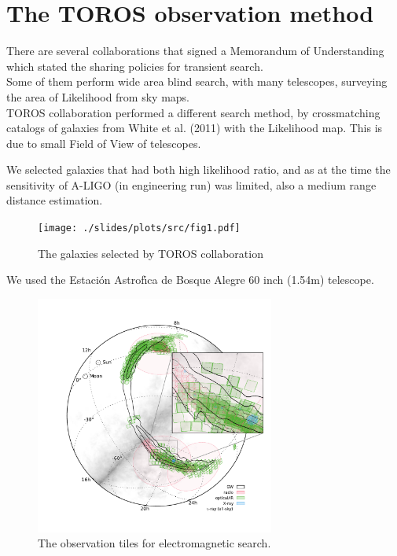 \documentclass[10pt]{beamer}
\begin{document}
\section{The TOROS observation method}
\begin{frame}
There are several collaborations that signed a Memorandum of Understanding
which stated the sharing policies for transient search.\\
Some of them perform wide area blind search, with many telescopes, surveying the 
area of Likelihood from sky maps.\\
TOROS collaboration performed a different search method, by crossmatching 
catalogs of galaxies from White et al. (2011) with the Likelihood map. 
This is due to small Field of View of telescopes.\\
\end{frame}
\begin{frame}
 We selected galaxies that had both high likelihood ratio, and as 
 at the time the sensitivity of A-LIGO (in engineering run) was 
 limited, also a medium range distance estimation.
 
 \begin{figure}
 \centering
 \texttt{[image: ./slides/plots/src/fig1.pdf]}
 \caption{The galaxies selected by TOROS collaboration}
 \label{fig:galaxies selected}
\end{figure}

\end{frame}
\begin{frame}
 We used the Estaci\'on Astrof\'{\i}ca de Bosque Alegre 60 inch (1.54m) telescope. 
 
 \begin{figure}
 \centering
 \includegraphics[width=0.7\textwidth]{./slides/plots/160208492v4/tiles.pdf}
 \caption{The observation tiles for electromagnetic search.}
 \label{fig:tiles}
\end{figure}

 \end{frame}
\end{document}
